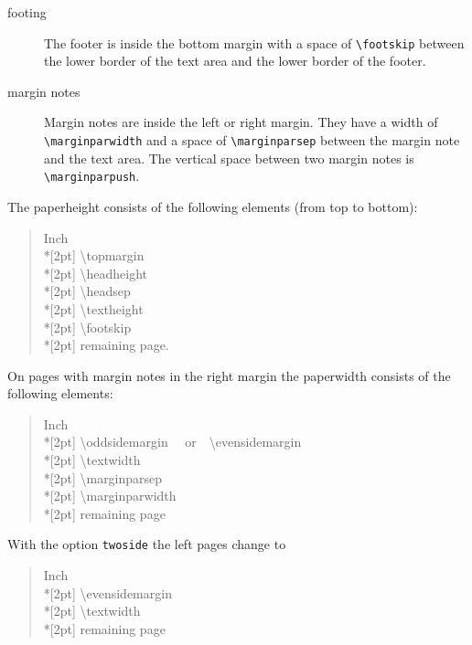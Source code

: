 \begin{description}
\item[footing]
	The footer is inside the bottom margin with a space of 
	\texttt{\textbackslash footskip} between the lower border of the text 
	area and the lower border of the footer.
	
\item[margin notes]
	Margin notes are inside the left or right margin.  They have a 
	width of \texttt{\textbackslash marginparwidth} and a space of 
	\texttt{\textbackslash marginparsep} between the margin note 
	and the text area.  The vertical space between two margin 
	notes is \texttt{\textbackslash marginparpush}.
		    
\end{description}

The paperheight consists of the following elements (from top to 
bottom):
\begin{verse}
 Inch \\*[2pt]
\ttfamily \textbackslash topmargin \\*[2pt]
\textbackslash headheight \\*[2pt]
\textbackslash headsep \\*[2pt]
\textbackslash textheight \\*[2pt]
\textbackslash footskip \\*[2pt]
\rmfamily remaining page.
\end{verse}

On pages with margin notes in the right margin the paperwidth consists 
of the following elements:
\begin{verse}
 Inch \\*[2pt]
\ttfamily \textbackslash oddsidemargin
\rmfamily\ \ or\ \ 
\ttfamily \textbackslash evensidemargin \\*[2pt]
\textbackslash textwidth \\*[2pt]
\textbackslash marginparsep \\*[2pt]
\textbackslash marginparwidth \\*[2pt]
\rm remaining page
\end{verse}
With the option \texttt{twoside} the left pages change to
\begin{verse}
 Inch \\*[2pt]
\ttfamily \textbackslash evensidemargin \\*[2pt]
\textbackslash textwidth \\*[2pt]
\rmfamily remaining page
\end{verse}

